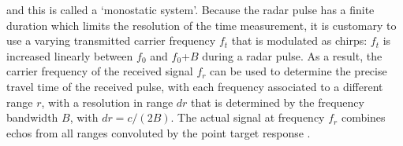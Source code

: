 and this is called a `monostatic system'. Because the radar pulse has a finite duration which limits the resolution of the time measurement, 
it is customary to use a varying transmitted carrier frequency $f_t$ that is modulated as chirps: $f_t$ is increased linearly between $f_0$ and $f_0$+$B$ during a radar pulse. As a result, the carrier frequency of the received signal $f_r$ can be used to determine the precise travel time of the received pulse, with each frequency associated to a different range $r$, with a resolution in range $dr$ that is determined by the frequency bandwidth $B$, with $dr=c /(2B)$. The actual signal at frequency $f_r$ combines echos from all ranges convoluted by the point target response \citep[e.g.][]{Halimi2013}.  


